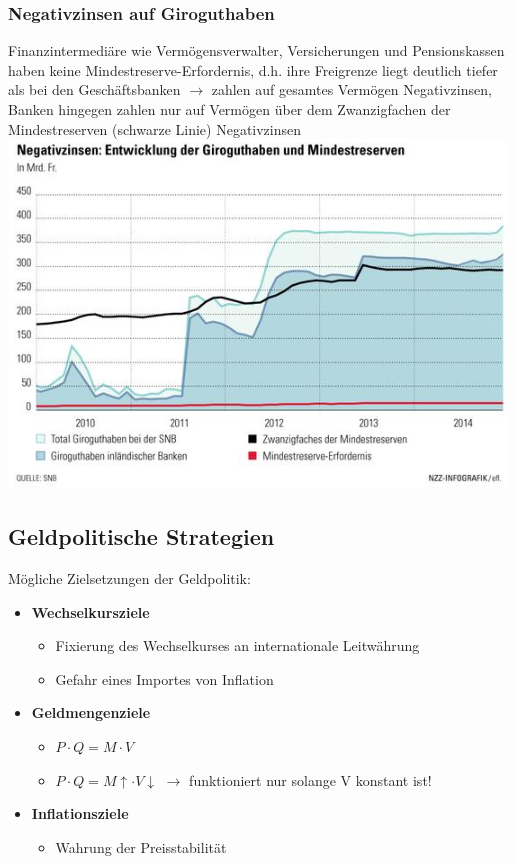 \subsubsection{Negativzinsen auf Giroguthaben}
\begin{multicols}{2}
	Finanzintermediäre wie Vermögensverwalter, Versicherungen und Pensionskassen haben keine Mindestreserve-Erfordernis, d.h. ihre Freigrenze liegt deutlich tiefer als bei den Geschäftsbanken $\rightarrow$ zahlen auf gesamtes Vermögen Negativzinsen, Banken hingegen zahlen nur auf Vermögen über dem Zwanzigfachen der Mindestreserven (schwarze Linie) Negativzinsen
	\vfill\null
	\includegraphics[width=\linewidth]{images/negativzinsen.png}
\end{multicols}

\subsection{Geldpolitische Strategien}
Mögliche Zielsetzungen der Geldpolitik:
\begin{itemize}
	\item \textbf{Wechselkursziele}
	\begin{itemize}
		\item Fixierung des Wechselkurses an internationale Leitwährung
		\item Gefahr eines Importes von Inflation
	\end{itemize}
	\item \textbf{Geldmengenziele}
	\begin{itemize}
		\item{} $P \cdot Q = M \cdot V$
		\item{} $P \cdot Q = M\uparrow \cdot V \downarrow$ \qquad $\rightarrow$ funktioniert nur solange V konstant ist!
	\end{itemize}
	\item \textbf{Inflationsziele}
	\begin{itemize}
		\item Wahrung der Preisstabilität
	\end{itemize}
\end{itemize}

